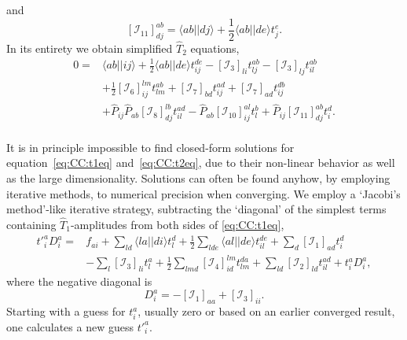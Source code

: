 and	
\begin{equation}
\left[\mathcal{I}_{11}\right]_{dj}^{ab} 
=
\langle ab || dj \rangle + \frac{1}{2} \langle ab||de \rangle t_j^e .
\end{equation}
In its entirety we obtain simplified $\hat{T}_2$ equations,
\begin{equation}
\label{eq:CC:t2eq}
\begin{split}
0
=&
\langle ab || ij \rangle
+ \frac{1}{2} \langle ab||de \rangle t_{ij}^{de}
-  \left[\mathcal{I}_3\right]_{li} t_{lj}^{ab}
-  \left[\mathcal{I}_3\right]_{lj} t_{il}^{ab}
\\
&
+  \frac{1}{2} \left[\mathcal{I}_6\right]_{ij}^{lm}  t_{lm}^{ab}
+  \left[\mathcal{I}_7\right]_{bd} t_{ij}^{ad} 
+ \left[\mathcal{I}_7\right]_{ad} t_{ij}^{db} 
\\
&
+\hat{P}_{ij} \hat{P}_{ab} \left[\mathcal{I}_8\right]_{dj}^{lb} t_{il}^{ad}
-\hat{P}_{ab} \left[\mathcal{I}_{10}\right]_{ij}^{al} t_l^b
+ \hat{P}_{ij} \left[\mathcal{I}_{11}\right]_{dj}^{ab} t_i^d .
\end{split}
\end{equation}


\paragraph*{}
It is in principle impossible to find closed-form solutions for equation~\eqref{eq:CC:t1eq} and~\eqref{eq:CC:t2eq}, due to their non-linear behavior as well as the large dimensionality.
Solutions can often be found anyhow, by employing iterative methods, to numerical precision when converging.
We employ a `Jacobi's method'-like iterative strategy, subtracting the `diagonal' of the simplest terms containing $\hat{T}_1$-amplitudes from both sides of \eqref{eq:CC:t1eq},
\begin{equation}
\begin{split}
\label{eq:CC:t1_iteration}
\left.t'\right._i^a D_i^a =& f_{ai}
 + \sum_{ld}  \langle la||di \rangle t_l^d  + \frac{1}{2} \sum_{lde} \langle al||de \rangle t_{il}^{de} 
+ \sum_d  \left[\mathcal{I}_1\right]_{ad}  t_i^d   
\\
&- \sum_l \left[\mathcal{I}_3\right]_{li} t_l^a 
+ \frac{1}{2} \sum_{lmd} \left[\mathcal{I}_4\right]_{id}^{lm} t_{lm}^{da}
+ \sum_{ld} \left[\mathcal{I}_2\right]_{ld} t_{il}^{ad}
+ t_i^a D_i^a,
\end{split}
\end{equation}
where the negative diagonal is
\begin{equation}
D_{i}^{a} =  - \left[\mathcal{I}_1\right]_{aa} + \left[\mathcal{I}_3\right]_{ii}.
\end{equation}
Starting with a guess for $t_i^a$, usually zero or based on an earlier converged result, one calculates a new guess $\left. t' \right._i^a$.


